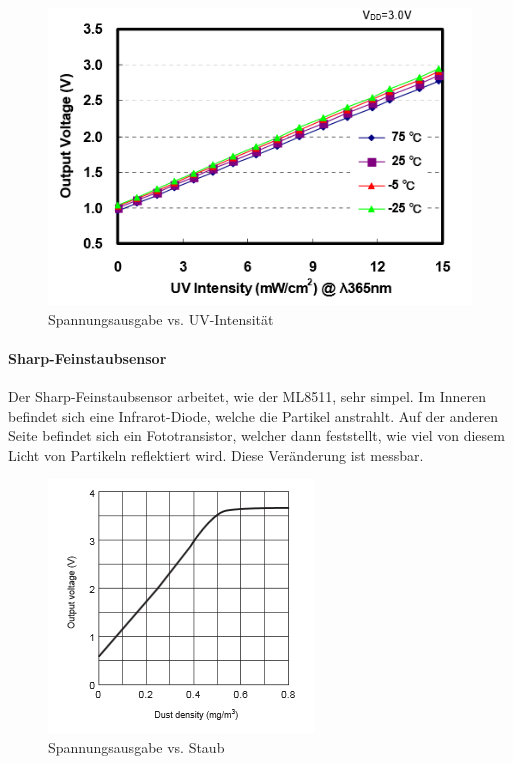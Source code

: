 \begin{figure}[h]
	\centering
	\includegraphics[scale=0.4]{2_Beschreibung_des_CANSAT/graph_photodiode_response.png}
	\caption{Spannungsausgabe vs. UV-Intensität}
	\label{graph photodiode}
\end{figure}


\paragraph{Sharp-Feinstaubsensor}
Der Sharp-Feinstaubsensor arbeitet, wie der ML8511, sehr simpel. Im Inneren befindet sich eine Infrarot-Diode, welche die Partikel anstrahlt. Auf der anderen Seite befindet sich ein Fototransistor, welcher dann feststellt, wie viel von diesem Licht von Partikeln reflektiert wird. Diese Veränderung ist messbar.

\begin{figure}[h]
	\centering
	\includegraphics[scale=0.5]{2_Beschreibung_des_CANSAT/graph_photodiode_sharp.png}
	\caption{Spannungsausgabe vs. Staub}
	\label{graph photodiode}
\end{figure}

